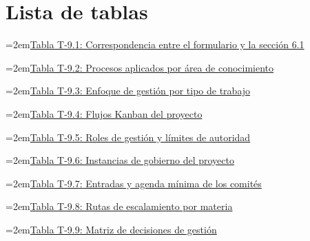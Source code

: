 \documentclass[11pt]{article}
\begin{document}

\tableofcontents
\clearpage
\section*{Lista de tablas}

\noindent\hangindent=2em\hyperref[tab:t9-indice]{Tabla T-9.1: Correspondencia entre el formulario y la sección 6.1}\dotfill\pageref{tab:t9-indice}\par\vspace{0.4\baselineskip}
\noindent\hangindent=2em\hyperref[tab:t9-procesos]{Tabla T-9.2: Procesos aplicados por área de conocimiento}\dotfill\pageref{tab:t9-procesos}\par\vspace{0.4\baselineskip}
\noindent\hangindent=2em\hyperref[tab:t9-enfoque]{Tabla T-9.3: Enfoque de gestión por tipo de trabajo}\dotfill\pageref{tab:t9-enfoque}\par\vspace{0.4\baselineskip}
\noindent\hangindent=2em\hyperref[tab:t9-kanban]{Tabla T-9.4: Flujos Kanban del proyecto}\dotfill\pageref{tab:t9-kanban}\par\vspace{0.4\baselineskip}
\noindent\hangindent=2em\hyperref[tab:t9-roles]{Tabla T-9.5: Roles de gestión y límites de autoridad}\dotfill\pageref{tab:t9-roles}\par\vspace{0.4\baselineskip}
\noindent\hangindent=2em\hyperref[tab:t9-instancias]{Tabla T-9.6: Instancias de gobierno del proyecto}\dotfill\pageref{tab:t9-instancias}\par\vspace{0.4\baselineskip}
\noindent\hangindent=2em\hyperref[tab:t9-agendas]{Tabla T-9.7: Entradas y agenda mínima de los comités}\dotfill\pageref{tab:t9-agendas}\par\vspace{0.4\baselineskip}
\noindent\hangindent=2em\hyperref[tab:t9-escalamiento]{Tabla T-9.8: Rutas de escalamiento por materia}\dotfill\pageref{tab:t9-escalamiento}\par\vspace{0.4\baselineskip}
\noindent\hangindent=2em\hyperref[tab:t9-decisiones]{Tabla T-9.9: Matriz de decisiones de gestión}\dotfill\pageref{tab:t9-decisiones}\par\vspace{0.4\baselineskip}
\end{document}
